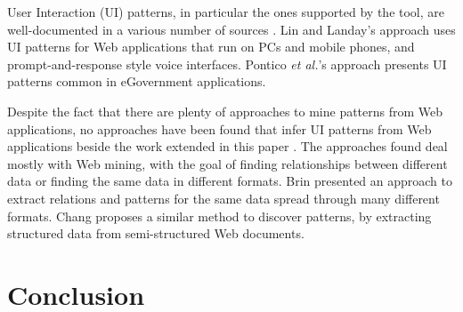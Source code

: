 \documentclass[conference]{IEEEtran}
\begin{document}
User Interaction (UI) patterns, in particular the ones supported by the tool, are well-documented in a various number of sources \cite{tidwell2010designing,van2001patterns, neil12standard,sinnig2005patterns}. Lin and Landay's approach \cite{lin2008employing} uses UI patterns for Web applications that run on PCs and mobile phones, and prompt-and-response style voice interfaces. Pontico \textit{et al.}'s approach \cite{pontico2008organizing} presents UI patterns common in eGovernment applications.

Despite the fact that there are plenty of approaches to mine patterns from Web applications, no approaches have been found that infer UI patterns from Web applications beside the work extended in this paper \cite{nabuco2013inferring, morgado2012gui}. The approaches found deal mostly with Web mining, with the goal of finding relationships between different data or finding the same data in different formats. Brin \cite{brin1999extracting} presented an approach to extract relations and patterns for the same data spread through many different formats. Chang \cite{chang2003automatic} proposes a similar method to discover patterns, by extracting structured data from semi-structured Web documents.

\section{Conclusion}\label{sec:conc}





\end{document}

